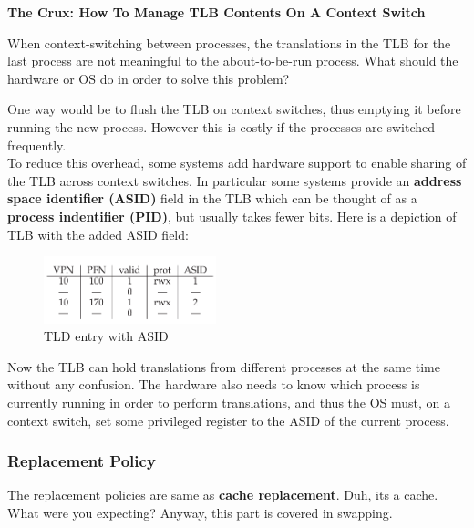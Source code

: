\begin{tcolorbox}
    \begin{center}
        \textbf{The Crux: How To Manage TLB Contents On A Context Switch}
    \end{center}

    When context-switching between processes, the translations in the TLB
    for the last process are not meaningful to the about-to-be-run process.
    What should the hardware or OS do in order to solve this problem?
\end{tcolorbox}

One way would be to flush the TLB on context switches, thus emptying it before
running the new process. However this is costly if the processes are switched
frequently.\\

To reduce this overhead, some systems add hardware support to enable sharing of
the TLB across context switches. In particular some systems provide an
\textbf{address space identifier (ASID)} field in the TLB which can be thought
of as a \textbf{process indentifier (PID)}, but usually takes fewer bits. Here
is a depiction of TLB with the added ASID field:

\begin{figure}[h!]
    \begin{center}
        \includegraphics[width=5cm]{img/ASID.png}
        \caption{TLD entry with ASID}
    \end{center}
\end{figure}

Now the TLB can hold translations from different processes at the same time
without any confusion. The hardware also needs to know which process is
currently running in order to perform translations, and thus the OS must, on 
a context switch, set some privileged register to the ASID of the current
process.

\subsubsection{Replacement Policy}

The replacement policies are same as \textbf{cache replacement}. Duh, its a
cache. What were you expecting? Anyway, this part is covered in swapping.
